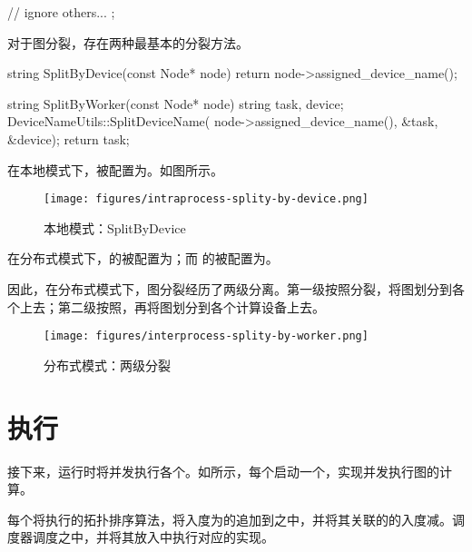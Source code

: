 \begin{content}
\begin{leftbar}
\begin{c++}
{  // ignore others...
};
\end{c++}
\end{leftbar}

对于图分裂，存在两种最基本的分裂方法。

\begin{leftbar}
\begin{c++}
string SplitByDevice(const Node* node) {
  return node->assigned_device_name();
}

string SplitByWorker(const Node* node) {
  string task, device;
  DeviceNameUtils::SplitDeviceName(
      node->assigned_device_name(), &task, &device);
  return task;
}
\end{c++}
\end{leftbar}

在本地模式下，被配置为。如图所示。

\begin{figure}[H]
\centering
\texttt{[image: figures/intraprocess-splity-by-device.png]}
\caption{本地模式：SplitByDevice}
 \label{fig:intraprocess-splity-by-device}
\end{figure}


在分布式模式下，的被配置为；而
的被配置为。

因此，在分布式模式下，图分裂经历了两级分离。第一级按照分裂，将图划分到各个上去；第二级按照，再将图划分到各个计算设备上去。

\begin{figure}[H]
\centering
\texttt{[image: figures/interprocess-splity-by-worker.png]}
\caption{分布式模式：两级分裂}
 \label{fig:interprocess-splity-by-worker}
\end{figure}

\section{执行}
\label{sec:graph-operation-exec}

接下来，运行时将并发执行各个。如所示，每个启动一个，实现并发执行图的计算。

每个将执行的拓扑排序算法，将入度为的追加到之中，并将其关联的的入度减。调度器调度之中，并将其放入中执行对应的实现。


\end{content}
